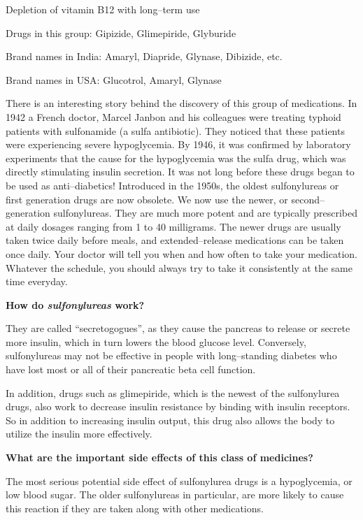  \item Depletion of vitamin B12 with long–term use


Drugs in this group: Gipizide, Glimepiride, Glyburide

Brand names in India: Amaryl, Diapride, Glynase, Dibizide, etc.

Brand names in USA: Glucotrol, Amaryl, Glynase

There is an interesting story behind the discovery of this group of medications. In 1942 a French doctor, Marcel Janbon and his colleagues were treating typhoid patients with sulfonamide (a sulfa antibiotic). They noticed that these patients were experiencing severe hypoglycemia. By 1946, it was confirmed by laboratory experiments that the cause for the hypoglycemia was the sulfa drug, which was directly stimulating insulin secretion. It was not long before these drugs began to be used as anti–diabetics! Introduced in the 1950s, the oldest sulfonylureas or first generation drugs are now obsolete. We now use the newer, or second–generation sulfonylureas. They are much more potent and are typically prescribed at daily dosages ranging from 1 to 40 milligrams. The newer drugs are usually taken twice daily before meals, and extended–release medications can be taken once daily. Your doctor will tell you when and how often to take your medication. Whatever the schedule, you should always try to take it consistently at the same time everyday.

\textbf{How do \textit{sulfonylureas} work?}

They are called “secretogogues”, as they cause the pancreas to release or secrete more insulin, which in turn lowers the blood glucose level. Conversely, sulfonylureas may not be effective in people with long–standing diabetes who have lost most or all of their pancreatic beta cell function.

In addition, drugs such as glimepiride, which is the newest of the sulfonylurea drugs, also work to decrease insulin resistance by binding with insulin receptors. So in addition to increasing insulin output, this drug also allows the body to utilize the insulin more effectively.

\textbf{What are the important side effects of this class of medicines?}

The most serious potential side effect of sulfonylurea drugs is a hypoglycemia, or low blood sugar. The older sulfonylureas in particular, are more likely to cause this reaction if they are taken along with other medications.

